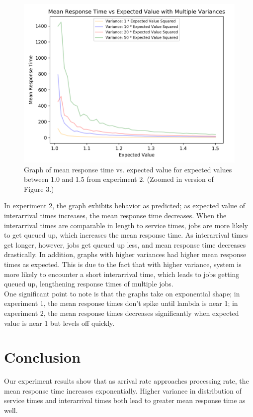 \documentclass[12pt]{article}
\begin{document}
\begin{figure}[H]
\includegraphics[width=\linewidth]{Analysis2_1_1.png}
\caption{Graph of mean response time vs. expected value for expected values between 1.0 and 1.5 from experiment 2. (Zoomed in version of Figure 3.)}
\end{figure}

In experiment 2, the graph exhibits behavior as predicted; as expected value of interarrival times increases, the mean response time decreases. When the interarrival times are comparable in length to service times, jobs are more likely to get queued up, which increases the mean response time. As interarrival times get longer, however, jobs get queued up less, and mean response time decreases drastically. In addition, graphs with higher variances had higher mean response times as expected. This is due to the fact that with higher variance, system is more likely to encounter a short interarrival time, which leads to jobs getting queued up, lengthening response times of multiple jobs. \\

One significant point to note is that the graphs take on exponential shape; in experiment 1, the mean response times don't spike until lambda is near 1; in experiment 2, the mean response times decreases significantly when expected value is near 1 but levels off quickly.

\section{Conclusion}
Our experiment results show that as arrival rate approaches processing rate, the mean response time increases exponentially. Higher variance in distribution of service times and interarrival times both lead to greater mean response time as well. \\
\end{document}
